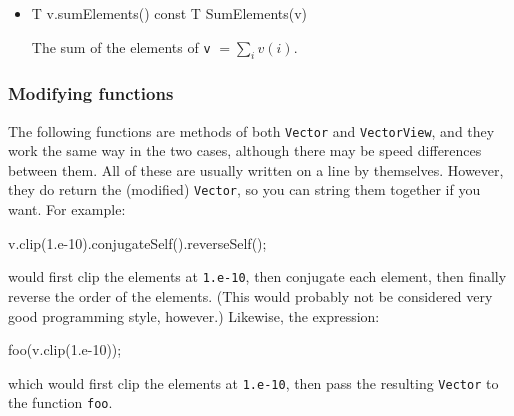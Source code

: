 \documentclass[twoside,letterpaper,11pt]{article}
\renewcommand{\tt}[1]{{\lstinline {#1}}}
\begin{document}
\begin{itemize}
\item
\begin{tmvcode}
T v.sumElements() const
T SumElements(v)
\end{tmvcode}
The sum of the elements of \tt{v} $= \sum_i v(i)$.

\end{itemize}


\subsubsection{Modifying functions}

The following functions are methods of both \tt{Vector} and \tt{VectorView},
and they work the same way in the two cases, although there may be speed differences
between them.  
All of these are usually written on a line by themselves.  However, they do
return the (modified) \tt{Vector}, so you can string them together if you want.
For example:
\begin{tmvcode}
v.clip(1.e-10).conjugateSelf().reverseSelf();
\end{tmvcode}
would first clip the elements at \tt{1.e-10}, then conjugate each element, then finally reverse the
order of the elements.  (This would probably not be considered 
very good programming style, however.)
Likewise, the expression:
\begin{tmvcode}
foo(v.clip(1.e-10));
\end{tmvcode}
which would first clip the elements at \tt{1.e-10},
then pass the resulting \tt{Vector} to the function \tt{foo}.  
\end{document}
